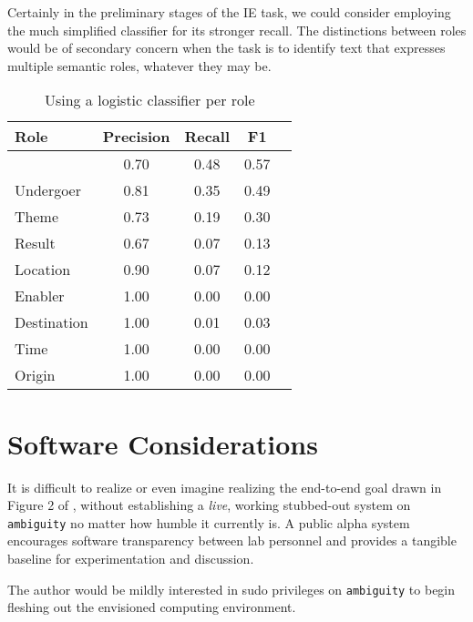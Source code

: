 \documentclass{article} %
\def\func#1{\textrm{\bf{\sc{#1}}}}
\begin{document}
Certainly in the preliminary stages of the IE task, we could consider employing the much simplified \func{semantic} classifier for its stronger recall.  The distinctions between roles would be of secondary concern when the task is to identify text that expresses multiple semantic roles, whatever they may be.
\begin{table}[ht]
\centering
\renewcommand{\arraystretch}{1.4}
\begin{tabular}{l c c c c} \toprule
Role & Precision & Recall & F1 \\ \midrule
\func{semantic} & 0.70 & 0.48 & 0.57 \\
Undergoer & 0.81 & 0.35 & 0.49 \\
Theme & 0.73 & 0.19 & 0.30 \\
Result & 0.67 & 0.07 & 0.13 \\
Location & 0.90 & 0.07 & 0.12 \\
Enabler & 1.00 & 0.00 & 0.00 \\
Destination & 1.00 & 0.01 & 0.03 \\
Time & 1.00 & 0.00 & 0.00 \\
Origin & 1.00 & 0.00 & 0.00 \\
\bottomrule
\end{tabular}
\caption{Using a logistic classifier per role}\label{binarize}
\end{table}
\section{Software Considerations}
It is difficult to realize or even imagine realizing the end-to-end goal drawn in Figure 2 of \cite{bala}, without establishing a {\em live}, working stubbed-out system on {\tt ambiguity} no matter how humble it currently is.  A public alpha system encourages software transparency between lab personnel and provides a tangible baseline for experimentation and discussion.

The author would be mildly interested in sudo privileges on {\tt ambiguity} to begin fleshing out the envisioned computing environment.
\end{document}
